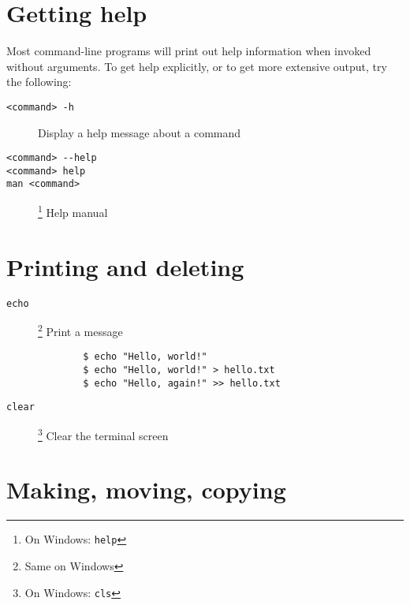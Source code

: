 \documentclass[a4paper]{tufte-handout}
\begin{document}
\hrulefill{}

\section{Getting help}

Most command-line programs will print out help information when invoked without
arguments. To get help explicitly, or to get more extensive output, try the
following:

\begin{description}
    \item [\texttt{<command> -h}]
        \hfill Display a help message about a command
    \item [\texttt{<command> -{}-help}]
        \hfill
    \item [\texttt{<command> help}]
        \hfill
    \item [\texttt{man <command>}]
        \footnote{On Windows: \texttt{help}}
        \hfill Help manual
\end{description}

\hrulefill{}

\section{Printing and deleting}

\begin{description}
    \item [\texttt{echo}]
        \footnote{Same on Windows}
        \hfill Print a message
        \begin{verbatim}
        $ echo "Hello, world!"
        $ echo "Hello, world!" > hello.txt
        $ echo "Hello, again!" >> hello.txt
        \end{verbatim}
    \item [\texttt{clear}]
        \footnote{On Windows: \texttt{cls}}
        \hfill Clear the terminal screen
\end{description}

\hrulefill{}

\section{Making, moving, copying}
\end{document}
